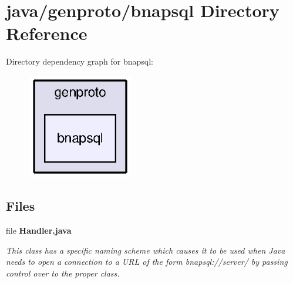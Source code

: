\section{java/genproto/bnapsql Directory Reference}
\label{dir_cb015bdd6bbc27dab8cbcb9f530241fa}
Directory dependency graph for bnapsql\+:
\nopagebreak
\begin{figure}[H]
\begin{center}
\leavevmode
\includegraphics[width=130pt]{dir_cb015bdd6bbc27dab8cbcb9f530241fa_dep}
\end{center}
\end{figure}
\subsection*{Files}
\begin{DoxyCompactItemize}
\item 
file {\bf Handler.\+java}
\begin{DoxyCompactList}\small\item\em This class has a specific naming scheme which causes it to be used when Java needs to open a connection to a U\+R\+L of the form bnapsql\+://server/ by passing control over to the proper class. \end{DoxyCompactList}\end{DoxyCompactItemize}
